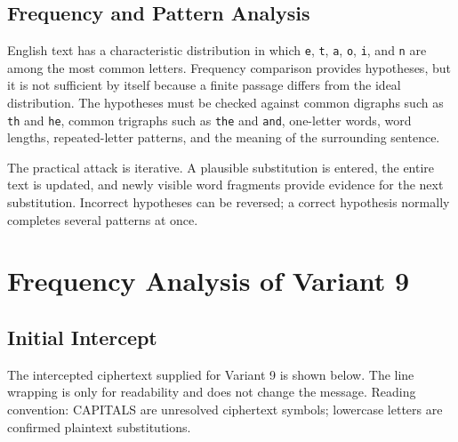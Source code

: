 \documentclass[12pt,a4paper]{article}
\begin{document}
\subsection{Frequency and Pattern Analysis}
English text has a characteristic distribution in which \texttt{e}, \texttt{t}, \texttt{a}, \texttt{o}, \texttt{i}, and \texttt{n} are among the most common letters. Frequency comparison provides hypotheses, but it is not sufficient by itself because a finite passage differs from the ideal distribution. The hypotheses must be checked against common digraphs such as \texttt{th} and \texttt{he}, common trigraphs such as \texttt{the} and \texttt{and}, one-letter words, word lengths, repeated-letter patterns, and the meaning of the surrounding sentence.

The practical attack is iterative. A plausible substitution is entered, the entire text is updated, and newly visible word fragments provide evidence for the next substitution. Incorrect hypotheses can be reversed; a correct hypothesis normally completes several patterns at once.

\newpage

\section{Frequency Analysis of Variant 9}
\subsection{Initial Intercept}
The intercepted ciphertext supplied for Variant 9 is shown below. The line wrapping is only for readability and does not change the message. Reading convention: CAPITALS are unresolved ciphertext symbols; lowercase letters are confirmed plaintext substitutions.
\end{document}
